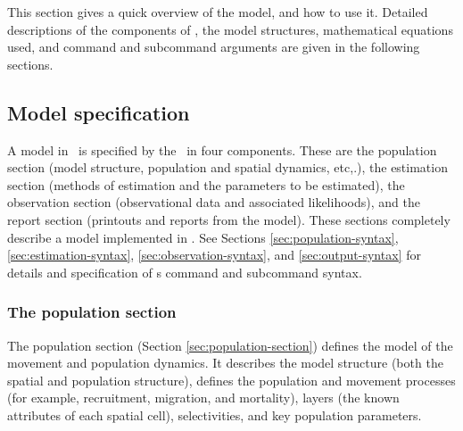 This section gives a quick overview of the model, and how to use it. Detailed descriptions of the components of \SPM, the model structures, mathematical equations used, and command and subcommand arguments are given in the following sections.

\subsection{Model specification}

A model in \SPM\ is specified by the \config\ in four components. These are the population section (model structure, population and spatial dynamics, etc,.), the estimation section (methods of estimation and the parameters to be estimated), the observation section (observational data and associated likelihoods), and the report section (printouts and reports from the model). These sections completely describe a model implemented in \SPM. See Sections \ref{sec:population-syntax}, \ref{sec:estimation-syntax}, \ref{sec:observation-syntax}, and \ref{sec:output-syntax} for details and specification of \SPM s command and subcommand syntax. 

\subsubsection{The population section}

The population section (Section \ref{sec:population-section}) defines the model of the movement and population dynamics. It describes the model structure (both the spatial and population structure), defines the population and movement processes (for example, recruitment, migration, and mortality), layers (the known attributes of each spatial cell), selectivities, and key population parameters.

